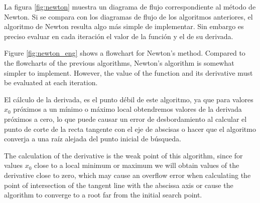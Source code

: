 \begin{paracol}{2}

La figura \ref{fig:newton} muestra un diagrama de flujo correspondiente al método de Newton. Si se compara con los diagramas de flujo de los algoritmos anteriores, el algoritmo de Newton resulta algo más simple de implementar. Sin embargo es preciso evaluar en cada iteración el valor de la función y el de su derivada. 

\switchcolumn

Figure \ref{fig:newton_eng} shows a flowchart for Newton's method. Compared to the flowcharts of the previous algorithms, Newton's algorithm is somewhat simpler to implement. However, the value of the function and its derivative must be evaluated at each iteration. 

\switchcolumn

El cálculo de la derivada, es el punto débil de este algoritmo, ya que para valores $x_0$ próximos a un mínimo o máximo local obtendremos valores de la derivada próximos a cero, lo que puede causar un error de desbordamiento al calcular el punto de corte de la recta tangente con el eje de abscisas o hacer que el algoritmo converja a una raíz alejada del punto inicial de búsqueda.
 
\switchcolumn

The calculation of the derivative is the weak point of this algorithm, since for values $x_0$ close to a local minimum or maximum we will obtain values of the derivative close to zero, which may cause an overflow error when calculating the point of intersection of the tangent line with the abscissa axis or cause the algorithm to converge to a root far from the initial search point.

\end{paracol}
\newpage
\begin{figure}

\centering
{} \qquad
{}\\
\qquad
{}\\
\qquad
{}

\label{fig:newton2}
\end{figure}





